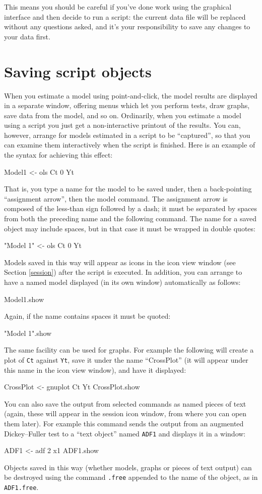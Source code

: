 This means you should be careful if you've done work using the
graphical interface and then decide to run a script: the current data
file will be replaced without any questions asked, and it's your
responsibility to save any changes to your data first.


\section{Saving script objects}
\label{sect-script-objects}

When you estimate a model using point-and-click, the model results are
displayed in a separate window, offering menus which let you perform
tests, draw graphs, save data from the model, and so on.  Ordinarily,
when you estimate a model using a script you just get a
non-interactive printout of the results.  You can, however, arrange
for models estimated in a script to be ``captured'', so that you can
examine them interactively when the script is finished.  Here is an
example of the syntax for achieving this effect:
    
\begin{code}
Model1 <- ols Ct 0 Yt
\end{code}
That is, you type a name for the model to be saved under, then a
back-pointing ``assignment arrow'', then the model command. The
assignment arrow is composed of the less-than sign followed by a dash;
it must be separated by spaces from both the preceding name and the
following command. The name for a saved object may include spaces, but
in that case it must be wrapped in double quotes:
\begin{code}
"Model 1" <- ols Ct 0 Yt
\end{code}
Models saved in this way will appear as icons in the 
icon view window (see Section \ref{session}) after the script is
executed.  In addition, you can arrange to have a named model
displayed (in its own window) automatically as follows:
\begin{code}
Model1.show
\end{code}
Again, if the name contains spaces it must be quoted:
\begin{code}
"Model 1".show
\end{code}
The same facility can be used for graphs.  For example the following
will create a plot of \verb+Ct+ against \verb+Yt+, save it under the
name ``CrossPlot'' (it will appear under this name in the icon
view window), and have it displayed:
\begin{code}
CrossPlot <- gnuplot Ct Yt
CrossPlot.show
\end{code}
You can also save the output from selected commands as named pieces of
text (again, these will appear in the session icon window, from where
you can open them later).  For example this command sends the output
from an augmented Dickey--Fuller test to a ``text object'' named
\verb+ADF1+ and displays it in a window:
\begin{code}
ADF1 <- adf 2 x1
ADF1.show
\end{code}
Objects saved in this way (whether models, graphs or pieces of text
output) can be destroyed using the command \verb+.free+ appended to
the name of the object, as in \verb+ADF1.free+.

